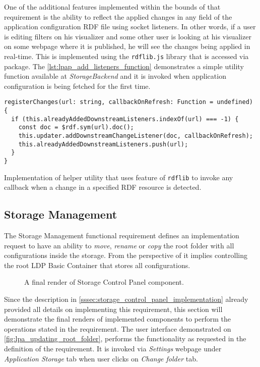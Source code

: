 One of the additional features implemented within the bounds of that requirement is the ability to reflect the applied changes in any field of the application configuration RDF file using socket listeners. In other words, if a user is editing filters on his visualizer and some other user is looking at his visualizer on some webpage where it is published, he will see the changes being applied in real-time. This is implemented using the \texttt{rdflib.js} library that is accessed via \lpas{} package. The \autoref{lst:lpap_add_listeners_function} demonstrates a simple utility function available at \textit{StorageBackend} and it is invoked when application configuration is being fetched for the first time. 


\begin{listing}[H]    
\begin{verbatim}
registerChanges(url: string, callbackOnRefresh: Function = undefined) {
  if (this.alreadyAddedDownstreamListeners.indexOf(url) === -1) {
    const doc = $rdf.sym(url).doc();
    this.updater.addDownstreamChangeListener(doc, callbackOnRefresh);
    this.alreadyAddedDownstreamListeners.push(url);
  }
}
\end{verbatim}
\caption{Implementation of helper utility that uses feature of \texttt{rdflib} to invoke any callback when a change in a specified RDF resource is detected.} 
\label{lst:lpap_add_listeners_function}
\end{listing}

\subsection{Storage Management}

The Storage Management functional requirement defines an implementation request to have an ability to \textit{move}, \textit{rename} or \textit{copy} the root folder with all configurations inside the storage. From the perspective of \lpas{} it implies controlling the root LDP Basic Container that stores all configurations.

\begin{figure}[h]
\centering
{}
\caption{A final render of Storage Control Panel component.}
\label{fig:lpa_updating_root_folder}
\end{figure}

Since the description in \autoref{sssec:storage_control_panel_implementation} already provided all details on implementing this requirement, this section will demonstrate the final renders of implemented components to perform the operations stated in the requirement. The user interface demonstrated on \autoref{fig:lpa_updating_root_folder}, performs the functionality as requested in the definition of the requirement. It is invoked via \textit{Settings} webpage under \textit{Application Storage} tab when user clicks on \textit{Change folder} tab. 

